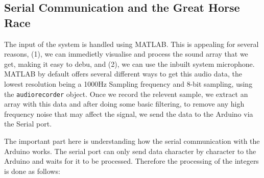 \subsection{Serial Communication and the Great Horse Race}
The input of the system is handled using MATLAB. This is appealing for several
reasons, (1), we can immedietly visualise and process the sound array that we
get, making it easy to debu, and (2), we can use the inbuilt system microphone.
MATLAB by default offers several different ways to get this audio data, the
lowest resolution being a 1000Hz Sampling frequency and 8-bit sampling, using
the \texttt{audiorecorder} object. Once we record the relevent sample, we
extract an array with this data and after doing some basic filtering, to remove
any high frequency noise that may affect the signal, we send the data to the
Arduino via the Serial port. 

The important part here is understanding how the serial communication with the
Arduino works. The serial port can only send data character by character to the
Arduino and waits for it to be processed. Therefore the processing of the
integers is done as follows: 

